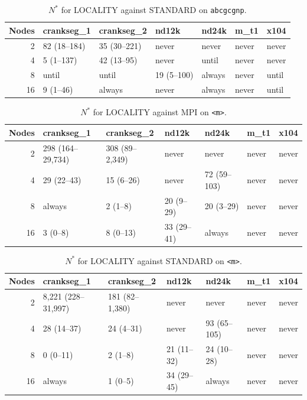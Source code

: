 \documentclass[11pt]{article}
\newcommand{\kM}{\texttt{<m>}}
\newcommand{\cgnp}{\texttt{abcgcgnp}}
\begin{document}
\begin{table}[H]
\centering
\footnotesize
\setlength{\tabcolsep}{3.5pt}
\caption{$N^*$ for LOCALITY against STANDARD on \cgnp.}
\label{tab:app:h8abcgcgnpSTANDARD}
\begin{tabular}{@{}rllllll@{}}
\toprule
Nodes & crankseg\_1 & crankseg\_2 & nd12k & nd24k & m\_t1 & x104 \\
\midrule
2 & 82 (18--184) & 35 (30--221) & never & never & never & never \\
4 & 5 (1--137) & 42 (13--95) & never & until & never & never \\
8 & until & until & 19 (5--100) & always & never & until \\
16 & 9 (1--46) & always & never & always & never & until \\
\bottomrule
\end{tabular}
\end{table}



\begin{table}[H]
\centering
\footnotesize
\setlength{\tabcolsep}{3.5pt}
\caption{$N^*$ for LOCALITY against MPI on \kM.}
\label{tab:app:h8pmMPI}
\begin{tabular}{@{}rllllll@{}}
\toprule
Nodes & crankseg\_1 & crankseg\_2 & nd12k & nd24k & m\_t1 & x104 \\
\midrule
2 & 298 (164--29,734) & 308 (89--2,349) & never & never & never & never \\
4 & 29 (22--43) & 15 (6--26) & never & 72 (59--103) & never & never \\
8 & always & 2 (1--8) & 20 (9--29) & 20 (3--29) & never & never \\
16 & 3 (0--8) & 8 (0--13) & 33 (29--41) & always & never & never \\
\bottomrule
\end{tabular}
\end{table}



\begin{table}[H]
\centering
\footnotesize
\setlength{\tabcolsep}{3.5pt}
\caption{$N^*$ for LOCALITY against STANDARD on \kM.}
\label{tab:app:h8pmSTANDARD}
\begin{tabular}{@{}rllllll@{}}
\toprule
Nodes & crankseg\_1 & crankseg\_2 & nd12k & nd24k & m\_t1 & x104 \\
\midrule
2 & 8,221 (228--31,997) & 181 (82--1,380) & never & never & never & never \\
4 & 28 (14--37) & 24 (4--31) & never & 93 (65--105) & never & never \\
8 & 0 (0--11) & 2 (1--8) & 21 (11--32) & 24 (10--28) & never & never \\
16 & always & 1 (0--5) & 34 (29--45) & always & never & never \\
\bottomrule
\end{tabular}
\end{table}
\end{document}
